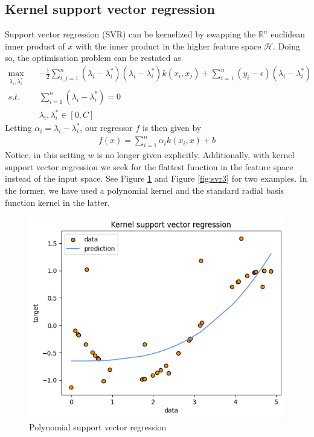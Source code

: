 \subsection{Kernel support vector regression}
Support vector regression (SVR) can be kernelized by swapping the $\mathbb{R}^n$ euclidean inner product of $x$ with the inner product in the higher feature space $\mathcal{H}$. Doing so, the optimisation problem can be restated as
\begin{equation}
    \begin{aligned}
        \max_{\lambda_i, \lambda_i^*} \quad& -\frac{1}{2}\sum\limits_{i,j=1}^n(\lambda_i-\lambda_i^*)(\lambda_i-\lambda_i^*)k(x_i, x_j)+\sum\limits_{i=1}^n(y_i-\epsilon)(\lambda_i-\lambda_i^*)
        \\
        s.t. \quad& \sum\limits_{i=1}^n(\lambda_i-\lambda_i^*)=0
        \\
        \quad& \lambda_i, \lambda_i^* \in [0,C]
    \end{aligned}
\end{equation}
Letting $\alpha_i=\lambda_i - \lambda_i^*$, our regressor $f$ is then given by
\begin{equation}
    \begin{aligned}
        f(x)=\sum\limits_{i=1}^n \alpha_i k(x_i, x)+b
    \end{aligned}
\end{equation}
Notice, in this setting $w$ is no longer given explicitly. Additionally, with kernel support vector regression we seek for the flattest function in the feature space instead of the input space.
See Figure \ref{fig:svr2} and Figure \ref{fig:svr3} for two examples. In the former, we have used a polynomial kernel and the standard radial basis function kernel in the latter.
\begin{figure}
    \includegraphics[width=\textwidth]{images/svr2.png}
    \caption{Polynomial support vector regression}
    \label{fig:svr2}
\end{figure}

